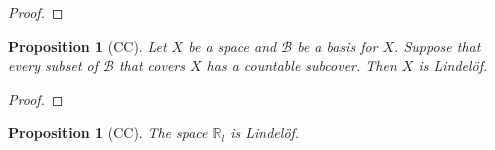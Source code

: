 \documentclass{report}
\let\qed\relax
\newtheorem{prop}[lm]{Proposition}
\theoremstyle{definition}
\begin{document}
  \begin{proof}
   \pf
  \end{proof}

  \begin{prop}[CC]
    \label{prop:topology:Lindelof:basis}
    Let $X$ be a space and $\mathcal{B}$ be a basis for $X$. Suppose that every
    subset of $\mathcal{B}$ that covers $X$ has a countable subcover. Then $X$
    is Lindel\"{o}f.
  \end{prop}

  \begin{proof}
   \pf
   \qed
  \end{proof}

  \begin{prop}[CC]
    The space $\mathbb{R}_l$ is Lindel\"{o}f.
  \end{prop}
\end{document}
